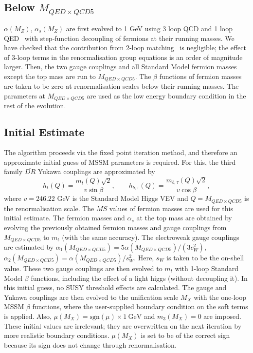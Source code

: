 \documentclass{article}
\def\gev{~\mbox{GeV}}
\begin{document}
\subsection{Below $M_{QED\times QCD5}$}

$\alpha(M_Z)$, $\alpha_s(M_Z)$ are first evolved to 1 GeV using 3 loop QCD and
1 loop QED~\cite{Gorishnii:1990zu,Tarasov:1980au,Gorishnii:1984zi} with
step-function decoupling of fermions at their running masses.
We have checked that the contribution from 2-loop
matching~\cite{Chetyrkin:1997sg} is negligible; the effect of 3-loop terms in
the renormalisation group equations
is an order of magnitude larger.
Then, the two gauge couplings and all Standard Model fermion masses except
the top mass are run to $M_{QED \times QCD5}$. The $\beta$ functions of fermion
masses are 
taken to be zero at renormalisation scales below their running masses.
The parameters at $M_{QED \times QCD5}$ are used as the low energy boundary condition in the
rest of the evolution.

\subsection{Initial Estimate}

The algorithm proceeds via the fixed point iteration method, and therefore an
approximate 
initial guess of MSSM parameters is required. 
For this, the third family $\overline{DR}$ Yukawa couplings are approximated
by 
\begin{equation}
h_t(Q) = \frac{m_t(Q) \sqrt{2}}{v \sin \beta}, \qquad
h_{b,\tau}(Q) = \frac{m_{b,\tau}(Q) \sqrt{2}}{v \cos \beta},
\end{equation}
where $v=246.22$ GeV is the Standard Model Higgs VEV and
$Q=M_{QED\times QCD5}$ is the renormalisation scale.
The $\overline{MS}$ values of fermion masses are used for this initial
estimate. 
The fermion masses and $\alpha_s$
at the top mass are obtained by evolving the previously
obtained fermion masses and gauge couplings from $M_{QED \times QCD5}$ to $m_t$ (with the same
accuracy). 
The electroweak gauge couplings are estimated by $\alpha_1(M_{QED \times QCD5})
= 5 \alpha(M_{QED \times QCD5}) / (3 c_W^2)$, $\alpha_2(M_{QED \times QCD5}) = \alpha(M_{QED \times QCD5}) / s_W^2$. Here,
$s_W$ is taken to be the on-shell value. These two gauge couplings are then
evolved 
to $m_t$ with 1-loop Standard Model $\beta$ functions, including the effect of
a light higgs (without decoupling it). In this initial guess, no SUSY
threshold effects are calculated. The gauge and Yukawa couplings are then
evolved to the unification scale $M_X$ with the one-loop MSSM $\beta$
functions, where the user-supplied boundary 
condition on the soft terms is applied. 
Also, $\mu(M_X) =
\mbox{sgn}(\mu)\times1\gev$ and $m_3(M_X)=0$ are imposed. 
These initial values are irrelevant; they are overwritten on the next
iteration by more realistic boundary conditions.
$\mu(M_X)$ is set to be of the correct sign
because its sign does not change through renormalisation. 
\end{document}
